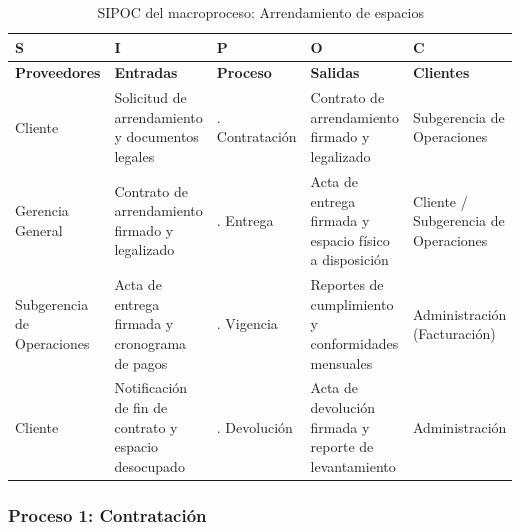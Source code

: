 \documentclass[11pt, a4paper, oneside]{report}
\begin{document}
\begin{table}[H]
\centering\small
\renewcommand{\arraystretch}{1.3}
\setlength{\tabcolsep}{4pt}
\begin{tabularx}{\textwidth}{|>{\raggedright\arraybackslash}p{}|>{\raggedright\arraybackslash}p{}|>{\raggedright\arraybackslash}p{}|>{\raggedright\arraybackslash}p{}|>{\raggedright\arraybackslash}X|}
\hline
\rowcolor{upeu_dark}
\color{white}\bfseries S & \color{white}\bfseries I & \color{white}\bfseries P & \color{white}\bfseries O & \color{white}\bfseries C \\ \hline
\rowcolor{upeu_light}
\bfseries Proveedores & \bfseries Entradas & \bfseries Proceso & \bfseries Salidas & \bfseries Clientes \\ \hline
Cliente &
Solicitud de arrendamiento y documentos legales &
1. Contratación &
Contrato de arrendamiento firmado y legalizado &
Subgerencia de Operaciones \\ \hline
\rowcolor{gray!10}
Gerencia General &
Contrato de arrendamiento firmado y legalizado &
2. Entrega &
Acta de entrega firmada y espacio físico a disposición &
Cliente / Subgerencia de Operaciones \\ \hline
Subgerencia de Operaciones &
Acta de entrega firmada y cronograma de pagos &
3. Vigencia &
Reportes de cumplimiento y conformidades mensuales &
Administración (Facturación) \\ \hline
\rowcolor{gray!10}
Cliente &
Notificación de fin de contrato y espacio desocupado &
4. Devolución &
Acta de devolución firmada y reporte de levantamiento &
Administración \\ \hline
\end{tabularx}
\caption{SIPOC del macroproceso: Arrendamiento de espacios}
\end{table}

\subsubsection{Proceso 1: Contratación}
\end{document}
